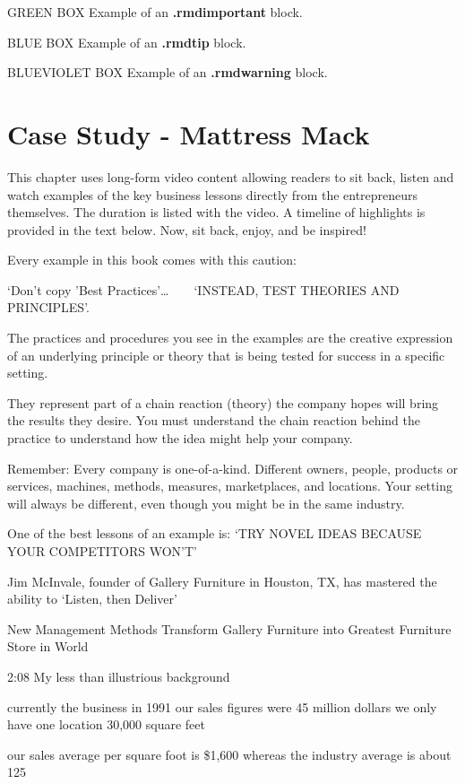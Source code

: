 \documentclass[
]{book}
\begin{document}
GREEN BOX Example of an \textbf{.rmdimportant} block.

BLUE BOX Example of an \textbf{.rmdtip} block.

BLUEVIOLET BOX Example of an \textbf{.rmdwarning} block.

\hypertarget{case-study---mattress-mack}{%
\chapter{Case Study - Mattress Mack}\label{case-study---mattress-mack}}

This chapter uses long-form video content allowing readers to sit back, listen and watch examples of the key business lessons directly from the entrepreneurs themselves. The duration is listed with the video. A timeline of highlights is provided in the text below. Now, sit back, enjoy, and be inspired!

Every example in this book comes with this caution:

{`Don't copy 'Best Practices'}\ldots{} ~ ~ {`INSTEAD, TEST THEORIES AND PRINCIPLES'}.

The practices and procedures you see in the examples are the creative expression of an underlying principle or theory that is being tested for success in a specific setting.

They represent part of a chain reaction (theory) the company hopes will bring the results they desire. You must understand the chain reaction behind the practice to understand how the idea might help your company.

Remember: Every company is one-of-a-kind. Different owners, people, products or services, machines, methods, measures, marketplaces, and locations. Your setting will always be different, even though you might be in the same industry.

One of the best lessons of an example is: {`TRY NOVEL IDEAS BECAUSE YOUR COMPETITORS WON'T'}

Jim McInvale, founder of Gallery Furniture in Houston, TX, has mastered the ability to `Listen, then Deliver'

New Management Methods Transform Gallery Furniture into Greatest Furniture Store in World

2:08 My less than illustrious background

currently the business in 1991 our sales figures were 45 million dollars we only have one location 30,000 square feet

our sales average per square foot is \$1,600 whereas the industry average is about 125
\end{document}
